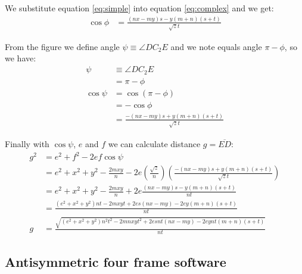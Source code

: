 \documentclass[11pt]{article}
\begin{document}
We substitute equation \ref{eq:simple} into equation \ref{eq:complex} and we get:
\begin{align}
\cos\phi &= \frac{(nx - my)s - y(m+n)(s+t)}{\sqrt{z}t}
\end{align}

From the figure we define angle $\psi \equiv \angle{DC_2E}$ and we note equals angle $\pi - \phi$, so we have:
\begin{align}
\psi &\equiv \angle{DC_2E}\\
 &= \pi - \phi\\
\cos\psi &= \cos(\pi - \phi)\\
 &= -\cos\phi\nonumber\\
 &= \frac{-(nx - my)s + y(m+n)(s+t)}{\sqrt{z}t}
\end{align}

Finally with $\cos\psi$, $e$ and $f$ we can calculate distance $g = \overline{ED}$:
\begin{align}
g^2 &= e^2 + f^2 - 2ef\cos\psi\\
 &= e^2 + x^2 + y^2 - \frac{2mxy}{n} 
 - 2e\left(\frac{\sqrt{z}}n\right)\left(\frac{-(nx - my)s + y(m+n)(s+t)}{\sqrt{z}t}\right)\\
 &= e^2 + x^2 + y^2 - \frac{2mxy}{n} 
 + 2e\frac{(nx - my)s - y(m+n)(s+t)}{nt}\\
 &= \frac{
  (e^2 + x^2 + y^2)nt - 2mxyt + 2es(nx - my) - 2ey(m+n)(s+t)
 }{nt}\nonumber\\
g &= \frac{\sqrt{
(e^2 + x^2 + y^2)n^2t^2 - 2mnxyt^2 + 2esnt(nx - my) - 2eynt(m+n)(s+t)
}}{nt}
\end{align}

\subsection{Antisymmetric four frame software}



%
\end{document}
